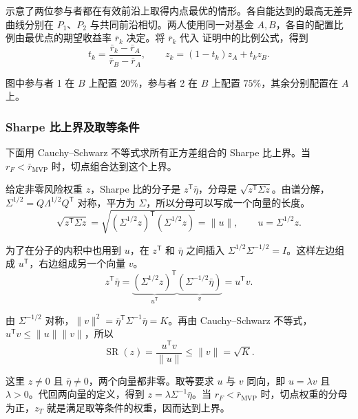\begin{tcolorbox}[knowledge,title={两基金分离的配置示例}]
 示意了两位参与者都在有效前沿上取得内点最优的情形。各自能达到的最高无差异曲线分别在 $P_1$、$P_2$ 与共同前沿相切。两人使用同一对基金 $A,B$，各自的配置比例由最优点的期望收益率 $\bar r_k$ 决定。将 $\bar r_k$ 代入 证明中的比例公式，得到
\[
 t_k=\frac{\bar r_k-\bar r_A}{\bar r_B-\bar r_A},
 \qquad z_k=(1-t_k)z_A+t_kz_B.
\]

图中参与者 1 在 $B$ 上配置 $20\%$，参与者 2 在 $B$ 上配置 $75\%$，其余分别配置在 $A$ 上。

\begin{center}
\begin{minipage}{\linewidth}
\centering
\renewcommand{\thewjFigure}{\thechapter.S\arabic{wjFigure}}%
%
\par
{}
\end{minipage}
\end{center}
\end{tcolorbox}

\subsubsection*{Sharpe 比上界及取等条件}
\label{proof:wj-twelve-sharpe-bound}
下面用 Cauchy--Schwarz 不等式求所有正方差组合的 Sharpe 比上界。当 $r_F<\bar r_{\mathrm{MVP}}$ 时，切点组合达到这个上界。

\begin{solution}[label-content={证明},blank-type=none]
给定非零风险权重 $z$，Sharpe 比的分子是 $z^{\mathsf T}\bar\eta$，分母是 $\sqrt{z^{\mathsf T}\Sigma z}$。由谱分解，$\Sigma^{1/2}=Q\Lambda^{1/2}Q^{\mathsf T}$ 对称，平方为 $\Sigma$，所以分母可以写成一个向量的长度。
\[
 \sqrt{z^{\mathsf T}\Sigma z}
 =\sqrt{(\Sigma^{1/2}z)^{\mathsf T}(\Sigma^{1/2}z)}
 =\lVert u\rVert,\qquad u=\Sigma^{1/2}z.
\]

为了在分子的内积中也用到 $u$，在 $z^{\mathsf T}$ 和 $\bar\eta$ 之间插入 $\Sigma^{1/2}\Sigma^{-1/2}=I$。这样左边组成 $u^{\mathsf T}$，右边组成另一个向量 $v$。
\[
 z^{\mathsf T}\bar\eta
 =\underbrace{(\Sigma^{1/2}z)^{\mathsf T}}_{u^{\mathsf T}}
  \underbrace{(\Sigma^{-1/2}\bar\eta)}_{v}
 =u^{\mathsf T}v.
\]

由 $\Sigma^{-1/2}$ 对称，$\lVert v\rVert^2=\bar\eta^{\mathsf T}\Sigma^{-1}\bar\eta=K$。再由 Cauchy--Schwarz 不等式，$u^{\mathsf T}v\le\lVert u\rVert\lVert v\rVert$，所以
\[
 \operatorname{SR}(z)=\frac{u^{\mathsf T}v}{\lVert u\rVert}
 \le\lVert v\rVert=\sqrt K.
\]

这里 $z\ne0$ 且 $\bar\eta\ne0$，两个向量都非零。取等要求 $u$ 与 $v$ 同向，即 $u=\lambda v$ 且 $\lambda>0$。代回两向量的定义，得到 $z=\lambda\Sigma^{-1}\bar\eta$。当 $r_F<\bar r_{\mathrm{MVP}}$ 时，切点权重的分母为正，$z_T$ 就是满足取等条件的权重，因而达到上界。
\end{solution}


